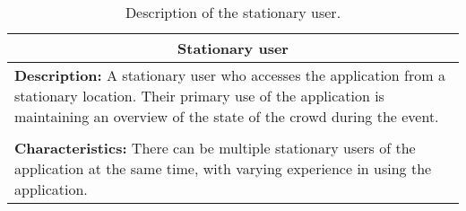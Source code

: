 \begin{table}[htbp]
    \centering
    \begin{tabularx}{/4}{X}
        \toprule
        \multicolumn{1}{c}{\textbf{Stationary user}} \\ 
        \midrule
        \textbf{Description:} A stationary user who accesses the application from a stationary location. Their primary use of the application is maintaining an overview of the state of the crowd during the event. \\
        \\
        \textbf{Characteristics:} There can be multiple stationary users of the application at the same time, with varying experience in using the application. \\
        \bottomrule
    \end{tabularx}
    \caption{Description of the stationary user.}
    \label{tab:stat_user}
\end{table}